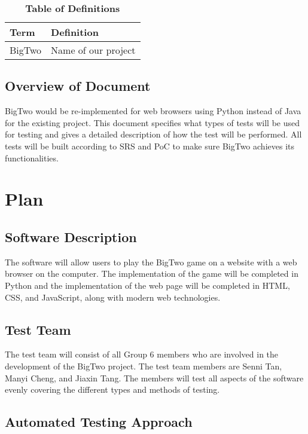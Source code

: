 \documentclass[12pt, titlepage]{article}
\begin{document}
\begin{table}[!htbp]
\caption{\textbf{Table of Definitions}} \label{Table}

\begin{tabularx}{\textwidth}{p{3cm}X}
\toprule
\textbf{Term} & \textbf{Definition}\\
\midrule
BigTwo & Name of our project\\
\bottomrule
\end{tabularx}

\end{table}	

\subsection{Overview of Document}
BigTwo would be re-implemented for web browsers using Python instead of Java for the existing project. This document specifies what types of tests will be used for testing and gives a detailed description of how the test will be performed. All tests will be built according to SRS and PoC to make sure BigTwo achieves its functionalities.

\section{Plan}
	
\subsection{Software Description}
The software will allow users to play the BigTwo game on a website with a web browser on the computer. The implementation of the game will be completed in Python and the implementation of the web page will be completed in HTML, CSS, and JavaScript, along with modern web technologies.

\subsection{Test Team}
The test team will consist of all Group 6 members who are involved in the development of the BigTwo project. The test team members are Senni Tan, Manyi Cheng, and Jiaxin Tang. The members will test all aspects of the software evenly covering the different types and methods of testing.

\subsection{Automated Testing Approach}
\end{document}
